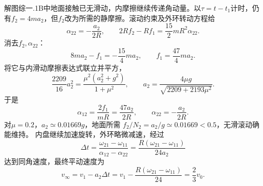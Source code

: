 \documentclass[UTF8,fontset=fandol,a4paper,11pt]{ctexart}
\begin{document}
解图综一.1B中地面接触已无滑动，内摩擦继续传递角动量。以$\tau=t-t_1$计时，仍有$f_2=4ma_2$，但$f_2$改为所需的静摩擦。滚动约束及外环转动方程给
\[
\alpha_{22}=-\frac{a_2}{2R},\qquad
2Rf_2-Rf_1=\frac{15}2mR^2\alpha_{22}.
\]
消去$f_2,\alpha_{22}$：
\[
8ma_2-f_1=-\frac{15}4ma_2,\qquad
f_1=\frac{47}4ma_2 .
\]
将它与内滑动摩擦表达式联立并平方，
\[
\frac{2209}{16}a_2^2
=\frac{\mu^2(a_2^2+g^2)}{1+\mu^2},
\qquad
\boxed{a_2=\frac{4\mu g}{\sqrt{2209+2193\mu^2}}}.
\]
于是
\[
\alpha_{12}=\frac{2f_1}{mR}=\frac{47a_2}{2R},
\qquad \alpha_{22}=-\frac{a_2}{2R}.
\]
对$\mu=0.2$，$a_2\simeq0.01669g$，地面所需
$f_2/N_2=a_2/g\simeq0.01669<0.5$，无滑滚动确能维持。
内盘继续加速旋转，外环略微减速，经过
\[
\Delta t=\frac{\omega_{21}-\omega_{11}}
{\alpha_{12}-\alpha_{22}}
=\frac{R(\omega_{21}-\omega_{11})}{24a_2}
\]
达到同角速度，最终平动速度为
\[
v_\infty=v_1-a_2\Delta t
=v_1-\frac{R(\omega_{21}-\omega_{11})}{24}
=\boxed{\frac23v_0}.
\]
\end{document}
